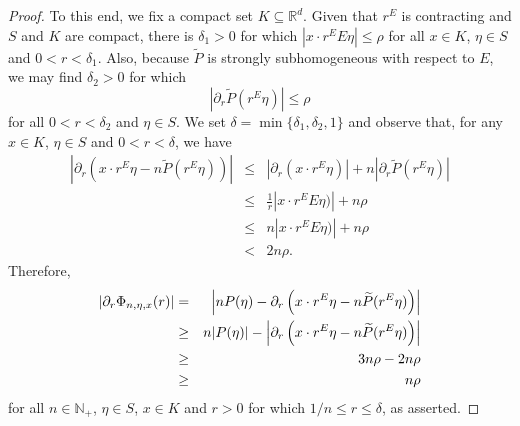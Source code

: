 \documentclass[11pt]{article}
\begin{document}
\begin{proof}
To this end, we fix a compact set $K\subseteq\mathbb{R}^d$. Given that $r^E$ is contracting and $S$ and $K$ are compact, there is $\delta_1>0$ for which $|x\cdot r^E E\eta|\leq \rho$ for all $x\in K$, $\eta\in S$ and $0<r<\delta_1$. Also, because $\widetilde{P}$ is strongly subhomogeneous with respect to $E$, we may find $\delta_2>0$ for which
\begin{equation*}
    |\partial_r\widetilde{P}(r^E\eta)|\leq \rho
\end{equation*}
for all $0<r<\delta_2$ and $\eta\in S$. We set $\delta=\min\{\delta_1,\delta_2,1\}$ and observe that, for any $x\in K$, $\eta\in S$ and $0<r<\delta$, we have
\begin{eqnarray*}
\left|\partial_r
\left(x\cdot r^E\eta
-n\widetilde{P}
(r^E\eta)\right)
\right|
&\leq &
\left|\partial_r\left(x\cdot r^E\eta\right)\right|+n\left|
\partial_r\widetilde{P}(r^E\eta)
\right|\\
&\leq&\frac{1}{r}|x\cdot r^E E\eta)|+n\rho\\
&\leq& n|x\cdot r^E E\eta)|+n\rho\\
&<&2n\rho.
\end{eqnarray*}
Therefore,
\begin{eqnarray*}
\abs{\partial_r\Phi_{n,\eta,x}(r)}&=&\abs{nP(\eta)-\partial_r\left(x\cdot r^E\eta-n\widetilde{P}(r^E\eta)\right)}\\
&\geq& n|P(\eta)|-\left|\partial_r
\left(x\cdot r^E\eta
-n\widetilde{P}
(r^E\eta)\right)
\right|\\
&\geq& 3n\rho-2n\rho\\
&\geq &n\rho
\end{eqnarray*}
for all $n\in\mathbb{N}_+$, $\eta\in S$, $x\in K$ and $r>0$ for which $1/n\leq r\leq \delta$, as asserted.
\end{proof}
\end{document}
